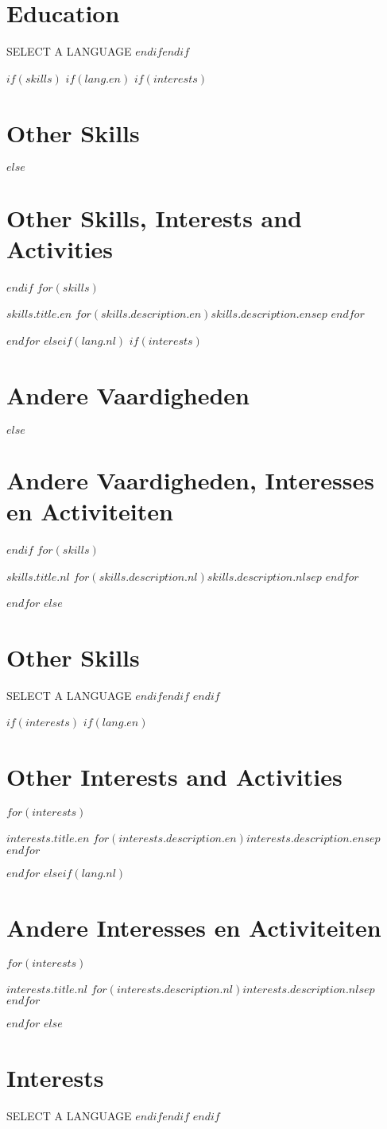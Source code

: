 \documentclass[11pt,letterpaper]{moderncv}
\renewcommand{\cvitem}[3][.25em]{%
  \begin{mycvlist}
    \item[#2] #3
    \end{mycvlist}
    \addvspace{#1}}
\begin{document}
	\section{Education}
	SELECT A LANGUAGE
$endif$$endif$

$if(skills)$
$if(lang.en)$
	$if(interests)$
		\section{Other Skills}
	$else$
		\section{Other Skills, Interests and Activities}
	$endif$
	$for(skills)$
		\cvitem{$skills.title.en$}
		{$for(skills.description.en)$$skills.description.en$$sep$ \medskip{}\newline{}
			$endfor$}
	$endfor$
$else$$if(lang.nl)$
	$if(interests)$
		\section{Andere Vaardigheden}
	$else$
		\section{Andere Vaardigheden, Interesses en Activiteiten}
	$endif$
	$for(skills)$
		\cvitem{$skills.title.nl$}
		{$for(skills.description.nl)$$skills.description.nl$$sep$ \medskip{}\newline{}
		 	 $endfor$}
	$endfor$
$else$
	\section{Other Skills}
	SELECT A LANGUAGE
$endif$$endif$
$endif$

$if(interests)$
$if(lang.en)$
	\section{Other Interests and Activities}
	$for(interests)$
		\cvitem{$interests.title.en$}
		{$for(interests.description.en)$$interests.description.en$$sep$ \medskip{}\newline{}
		 	 $endfor$}
	$endfor$
$else$$if(lang.nl)$
	\section{Andere Interesses en Activiteiten}
	$for(interests)$
		\cvitem{$interests.title.nl$}
		{$for(interests.description.nl)$$interests.description.nl$$sep$ \medskip{}\newline{}
		 	 $endfor$}
	$endfor$
$else$
	\section{Interests}
	SELECT A LANGUAGE
$endif$$endif$
$endif$
\end{document}
